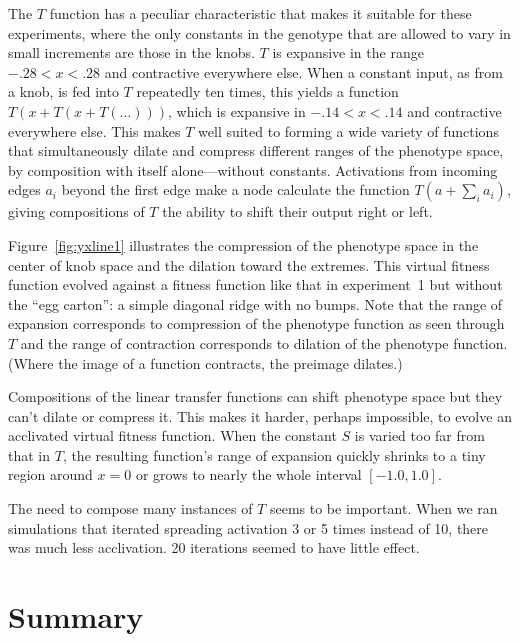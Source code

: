 \documentclass[letterpaper]{article}
\begin{document}
The $T$ function has a peculiar characteristic that makes it suitable for
these experiments, where the only constants in the genotype that are allowed to
vary in small increments are those in the knobs. $T$ is expansive in the range
$-.28 < x < .28$ and contractive everywhere else. When a constant input, as
from a knob, is fed into $T$ repeatedly ten times, this yields a function
$T(x+T(x+T(\ldots)))$, which is expansive in $-.14 < x < .14$ and contractive
everywhere else. This makes $T$ well suited to forming a wide variety of
functions that simultaneously dilate and compress different ranges of the
phenotype space, by composition with itself alone---without constants.
Activations from incoming edges $a_{i}$ beyond the first edge make a node
calculate the function $T(a + \sum_i a_i)$, giving compositions of $T$ the
ability to shift their output right or left.

Figure~\ref{fig:yxline1} illustrates the compression of the phenotype space in the center of
knob space and the dilation toward the extremes. This virtual fitness function
evolved against a fitness function like that in experiment~1 but without the
``egg carton'': a simple diagonal ridge with no bumps. Note that the range of
expansion corresponds to compression of the phenotype function as seen through
$T$ and the range of contraction corresponds to dilation of the phenotype
function. (Where the image of a function contracts, the preimage dilates.)

Compositions of the linear transfer functions can shift phenotype space but they
can't dilate or compress it. This makes it harder, perhaps impossible, to
evolve an acclivated virtual fitness function. When the constant $S$ is varied
too far from that in $T$, the resulting function's range of expansion quickly
shrinks to a tiny region around $x=0$ or grows to nearly the whole interval
$[-1.0, 1.0]$.

The need to compose many instances of $T$ seems to be important. When we ran
simulations that iterated spreading activation 3 or 5 times instead of 10,
there was much less acclivation. 20 iterations seemed to have little effect.

%
%
%

\section{Summary}





\end{document}
